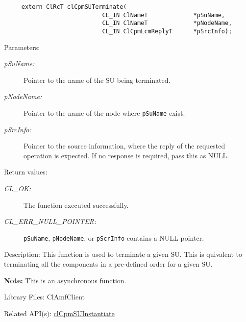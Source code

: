 {\begin{Desc}
\footnotesize\begin{verbatim}     extern ClRcT clCpmSUTerminate(
                			CL_IN ClNameT             *pSuName,
                			CL_IN ClNameT             *pNodeName,
                			CL_IN ClCpmLcmReplyT      *pSrcInfo);
\end{verbatim}
\normalsize
\end{Desc}
\begin{Desc}
\item[Parameters:]
\begin{description}
\item[{\em p\-Su\-Name:}]Pointer to the name of the SU being terminated. \item[{\em p\-Node\-Name:}]Pointer to the name of the node where 
{\tt{p\-Su\-Name}} exist. \item[{\em p\-Src\-Info:}]Pointer to the source information, where the reply of the requested operation is expected. If no 
response is required, pass this as NULL.\end{description}
\end{Desc}
\begin{Desc}
\item[Return values:]
\begin{description}
\item[{\em CL\_\-OK:}]The function executed successfully. \item[{\em CL\_\-ERR\_\-NULL\_\-POINTER:}]{\tt{pSuName}}, 
{\tt{p\-Node\-Name}}, or {\tt{p\-Scr\-Info}} contains a NULL pointer.\end{description}
\end{Desc}
\begin{Desc}
\item[Description:]This function is used to terminate a given SU. This is quivalent to terminating all the components in a pre-defined order for a given
SU.\end{Desc}
{\bf Note:} This is an asynchronous function.
\begin{Desc}
\item[Library Files:]Cl\-Amf\-Client\end{Desc}

\begin{Desc}
\item[Related API(s):]\hyperlink{group__group14}{cl\-Cpm\-SUInstantiate} \end{Desc}
\newpage



}
